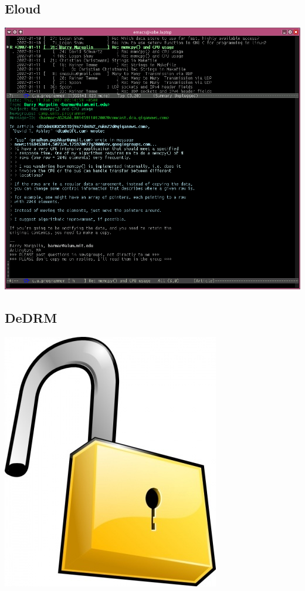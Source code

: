 \documentclass[11pt]{article}
\begin{document}
\subsection*{Eloud}
\label{sec:orgheadline14}
\includegraphics[width=.9\linewidth]{./images/gnus.png}
\subsection*{DeDRM}
\label{sec:orgheadline15}
\includegraphics[width=.9\linewidth]{./images/lock.jpg}
\end{document}
